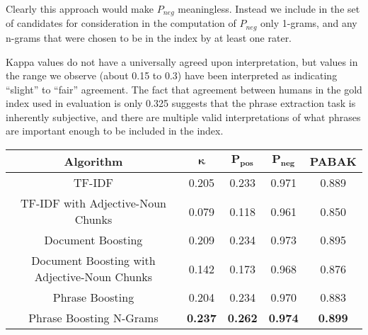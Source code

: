 Clearly this approach would make $P_{neg}$ meaningless. Instead we
include in the set of candidates for consideration in the computation
of $P_{neg}$ only 1-grams, and any n-grams that were chosen to be in
the index by at least one rater.

Kappa values do not have a universally agreed upon interpretation, but
values in the range we observe (about 0.15 to 0.3) have been
interpreted as indicating ``slight'' to ``fair'' agreement. The fact
that agreement between humans in the gold index used in evaluation is only 0.325 suggests that the phrase extraction
task is inherently subjective, and there are multiple valid
interpretations of what phrases are important enough to be included in
the index.



\begin{figure*}[!ht]
\caption{}
\label{fig:main_result}
\begin{tabular}{|c|c|c|c|c|}
\hline
\textbf{Algorithm} & $\mathbf{\kappa}$ & $\mathbf{P_{\text{pos}}}$ & $\mathbf{P_{\text{neg}}}$ & \textbf{PABAK} \\
\hline
TF-IDF & 0.205 & 0.233 & 0.971 & 0.889 \\
\hline
TF-IDF with Adjective-Noun Chunks & 0.079 & 0.118 & 0.961 & 0.850 \\
\hline
Document Boosting & 0.209 & 0.234 & 0.973 & 0.895 \\
\hline
Document Boosting with Adjective-Noun Chunks & 0.142 & 0.173 & 0.968 & 0.876 \\
\hline
Phrase Boosting & 0.204 & 0.234 & 0.970 & 0.883 \\
\hline
Phrase Boosting N-Grams & \textbf{0.237} & \textbf{0.262} & \textbf{0.974} & \textbf{0.899} \\
\hline
\end{tabular}
\end{figure*}

